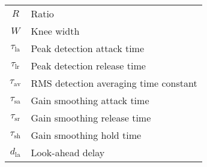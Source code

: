 \documentclass[../main2.tex]{subfiles}
\begin{document}
\begin{table}[h]
\begin{center}
\begin{tabular}{| c | l |}
	$R$ & Ratio \\
	$W$ & Knee width \\
	$\tau_\text{la}$ & Peak detection attack time \\
	$\tau_\text{lr}$ & Peak detection release time \\
	$\tau_\text{av}$ & RMS detection averaging time constant\\
	$\tau_\text{sa}$ & Gain smoothing attack time \\
	$\tau_\text{sr}$ & Gain smoothing release time \\
	$\tau_\text{sh}$ & Gain smoothing hold time \\
	$d_\text{la}$ & Look-ahead delay \\
	\hline
\end{tabular}
\end{center}

\end{table}
\end{document}
